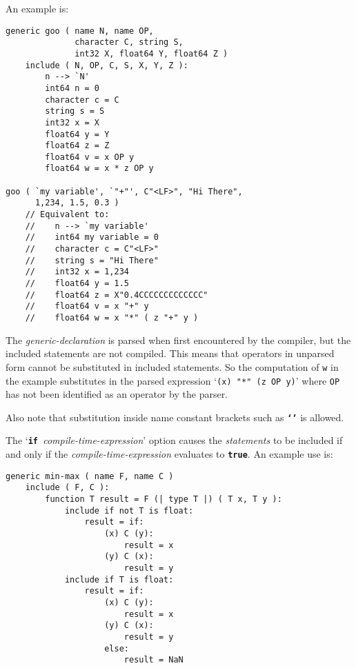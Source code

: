 \documentclass[12pt]{article}
\newcommand{\TT}[1]{{\tt \bfseries #1}}
\newenvironment{indpar}[1][0.3in]%
	{\begin{list}{}%
		     {\setlength{\itemsep}{0in}%
		      \setlength{\topsep}{0in}%
		      \setlength{\parsep}{1ex}%
		      \setlength{\labelwidth}{#1}%
		      \setlength{\leftmargin}{#1}%
		      \addtolength{\leftmargin}{\labelsep}}%
	 \item}%
	{\end{list}}
\begin{document}
An example is:
\begin{indpar}\begin{verbatim}
generic goo ( name N, name OP,
              character C, string S,
              int32 X, float64 Y, float64 Z )
    include ( N, OP, C, S, X, Y, Z ):
        n --> `N'
        int64 n = 0
        character c = C
        string s = S
        int32 x = X
        float64 y = Y
        float64 z = Z
        float64 v = x OP y
        float64 w = x * z OP y

goo ( `my variable', `"+"', C"<LF>", "Hi There",
      1,234, 1.5, 0.3 )
    // Equivalent to:
    //    n --> `my variable'
    //    int64 my variable = 0
    //    character c = C"<LF>"
    //    string s = "Hi There"
    //    int32 x = 1,234
    //    float64 y = 1.5
    //    float64 z = X"0.4CCCCCCCCCCCCC"
    //    float64 v = x "+" y
    //    float64 w = x "*" ( z "+" y )
\end{verbatim}\end{indpar}

The {\em generic-declaration} is parsed when first encountered
by the compiler, but the included statements are not
compiled.
This means that operators in unparsed form cannot be substituted
in included statements.  So the computation of {\tt w} in the
example substitutes in the parsed expression `{\tt (x) "*" (z OP y)}'
where {\tt OP} has not been identified as an operator by the parser.

Also note that substitution inside name constant brackets such as
\TT{`'} is allowed.

The `\TT{if }{\em compile-time-expression}' option
causes the {\em statements} to be included if and only if the
{\em compile-time-expression} evaluates to \TT{true}.  An example use is:
\begin{indpar}\begin{verbatim}
generic min-max ( name F, name C )
    include ( F, C ):
        function T result = F (| type T |) ( T x, T y ):
            include if not T is float:
                result = if:
                    (x) C (y):
                        result = x
                    (y) C (x):
                        result = y
            include if T is float:
                result = if:
                    (x) C (y):
                        result = x
                    (y) C (x):
                        result = y
                    else:
                        result = NaN
\end{verbatim}\end{indpar}
\end{document}

